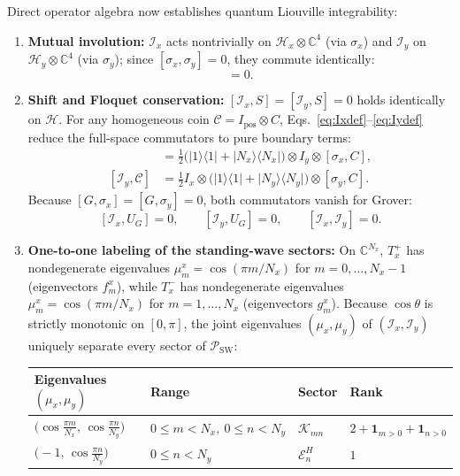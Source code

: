 \documentclass[11pt,a4paper,oneside]{report}
\newcommand{\ket}[1]{\lvert #1\rangle}
\newcommand{\bra}[1]{\langle #1\rvert}
\newcommand{\HH}{\mathcal H}
\newcommand{\CC}{\mathcal C}
\newcommand{\Id}{I}
\newcommand{\sw}{\mathrm{SW}}
\numberwithin{equation}{chapter}
\begin{document}
Direct operator algebra now establishes quantum Liouville integrability:
\begin{enumerate}
\item \textbf{Mutual involution:} \(\mathcal I_x\) acts nontrivially on
\(\HH_x\otimes\mathbb C^4\) (via \(\sigma_x\)) and \(\mathcal I_y\) on
\(\HH_y\otimes\mathbb C^4\) (via \(\sigma_y\)); since
\([\sigma_x,\sigma_y]=0\), they commute identically:
\begin{equation}
[\mathcal I_x,\mathcal I_y]=0.
\end{equation}
\item \textbf{Shift and Floquet conservation:} \([\mathcal I_x,S]=[\mathcal I_y,S]=0\)
holds identically on \(\HH\). For any homogeneous coin \(\CC=\Id_{\mathrm{pos}}\otimes C\),
Eqs.~\eqref{eq:Ixdef}--\eqref{eq:Iydef} reduce the full-space commutators to
pure boundary terms:
\begin{align}
[\mathcal I_x,\CC]&=\frac12\big(\ket1\bra1+\ket{N_x}\bra{N_x}\big)\otimes\Id_y\otimes[\sigma_x,C],\\
[\mathcal I_y,\CC]&=\frac12\Id_x\otimes\big(\ket1\bra1+\ket{N_y}\bra{N_y}\big)\otimes[\sigma_y,C].
\end{align}
Because \([G,\sigma_x]=[G,\sigma_y]=0\), both commutators vanish for Grover:
\begin{equation}
\boxed{
[\mathcal I_x,U_G]=0,\qquad [\mathcal I_y,U_G]=0,\qquad [\mathcal I_x,\mathcal I_y]=0.
}
\label{eq:groverintegrals}
\end{equation}
\item \textbf{One-to-one labeling of the standing-wave sectors:} On
\(\mathbb C^{N_x}\), \(T_x^+\) has nondegenerate eigenvalues
\(\mu_m^x=\cos(\pi m/N_x)\) for \(m=0,\ldots,N_x-1\) (eigenvectors
\(f_m^x\)), while \(T_x^-\) has nondegenerate eigenvalues
\(\mu_m^x=\cos(\pi m/N_x)\) for \(m=1,\ldots,N_x\) (eigenvectors
\(g_m^x\)). Because \(\cos\theta\) is strictly monotonic on \([0,\pi]\),
the joint eigenvalues \((\mu_x,\mu_y)\) of \((\mathcal I_x,\mathcal I_y)\)
uniquely separate every sector of \(\mathscr P_{\sw}\):
\begin{center}\small
\begin{tabular}{@{}llll@{}}\toprule
Eigenvalues \((\mu_x,\mu_y)\) & Range & Sector & Rank\\\midrule
\(\big(\cos\frac{\pi m}{N_x},\,\cos\frac{\pi n}{N_y}\big)\) & \(0\le m<N_x,\ 0\le n<N_y\) & \(\mathcal K_{mn}\) & \(2+\mathbf 1_{m>0}+\mathbf 1_{n>0}\)\\
\(\big(-1,\,\cos\frac{\pi n}{N_y}\big)\) & \(0\le n<N_y\) & \(\mathcal E_n^H\) & \(1\)\\

\end{tabular}
\end{center}
\end{enumerate}
\end{document}
